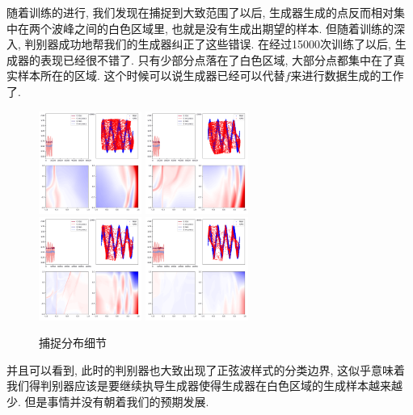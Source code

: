 \documentclass[lang=cn,11pt]{elegantpaper}
\begin{document}
随着训练的进行, 我们发现在捕捉到大致范围了以后, 生成器生成的点反而相对集中在两个波峰之间的白色区域里, 也就是没有生成出期望的样本. 但随着训练的深入, 判别器成功地帮我们的生成器纠正了这些错误. 在经过15000次训练了以后, 生成器的表现已经很不错了. 只有少部分点落在了白色区域, 大部分点都集中在了真实样本所在的区域. 这个时候可以说生成器已经可以代替$f$来进行数据生成的工作了. 
\begin{figure}[htbp]
\centering
  \includegraphics[width=0.3\textwidth]{sin_3_1}
  \includegraphics[width=0.3\textwidth]{sin_3_2}\\
  \includegraphics[width=0.3\textwidth]{sin_3_3}
  \includegraphics[width=0.3\textwidth]{sin_3_4}
  \caption{捕捉分布细节}
\end{figure}

并且可以看到, 此时的判别器也大致出现了正弦波样式的分类边界, 这似乎意味着我们得判别器应该是要继续执导生成器使得生成器在白色区域的生成样本越来越少. 但是事情并没有朝着我们的预期发展. 
\end{document}
